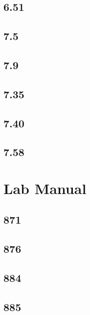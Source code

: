 \documentclass{article}
\begin{document}
\subsection{6.51}

\subsection{7.5}

\subsection{7.9}

\subsection{7.35}

\subsection{7.40}

\subsection{7.58}

\section{Lab Manual}

\subsection{871}

\subsection{876}

\subsection{884}

\subsection{885}
\end{document}
